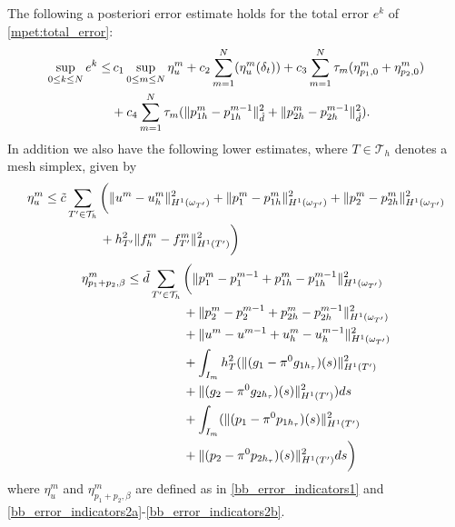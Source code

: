\begin{theorem} \label{theorem}
The following a posteriori error estimate holds for the total error $e^k$ of \eqref{mpet:total_error}: 
\begin{align} \label{mpet2_up_bd}
\sup\limits_{0\leq k \leq N} e^k \leq & \, c_1 \sup_{0\leq m\leq N } \eta^m_u + c_2\sum_{m=1}^N (\eta^m_u(\delta_t)) + c_3\sum_{m=1}^N \tau_m (\eta^m_{p_1,0} + \eta^m_{p_2,0}) \\
& + c_4\sum_{m=1}^N \tau_m (\|p^m_{1h} - p^{m-1}_{1h}\|_{\hat{d}}^2 + \|p^m_{2h} - p^{m-1}_{2h}\|_{\hat{d}}^2).\notag
\end{align}
In addition we also have the following lower estimates, where $T \in \mathcal{T}_h$ denotes a mesh simplex, given by 
\begin{align} \label{mpet2_low_bd1}
\eta^m_u \leq \tilde{c}\sum_{T' \in \mathcal{T}_h} & \,\biggl( \|u^m-u^m_h \|^2_{H^1(\omega_{T'})} + \|p_1^m-p^m_{1h} \|^2_{H^1(\omega_{T'})} + \|p_2^m-p^m_{2h} \|^2_{H^1(\omega_{T'})} \\
 & \, + h_{T'}^2 \|f^m_h-f^m_{T'}\|^2_{H^1(T')} \biggr) \notag
\end{align}
\begin{align}\label{mpet2_low_bd2}
\eta^m_{p_1+p_2,\beta} \leq \tilde{d} \sum_{T' \in \mathcal{T}_h} & \, \biggl(\|p_1^m-p_1^{m-1} + p_{1h}^m-p_{1h}^{m-1} \|^2_{H^1(\omega_{T'})} \\
& \, + \|p_2^m-p_2^{m-1} + p_{2h}^m-p_{2h}^{m-1} \|^2_{H^1(\omega_{T'})} \notag\\
& \, + \|u^m-u^{m-1} + u_h^m-u_h^{m-1} \|^2_{H^1(\omega_{T'})} \notag\\
& \, + \int_{I_m} h_{T}^2 (\|(g_1-\pi^0g_{1h_\tau})(s)\|^2_{H^1(T')} \notag\\
& \, + \|(g_2-\pi^0g_{2h_\tau})(s)\|^2_{H^1(T')}) ds  \notag\\
& \, + \int_{I_m} (\|(p_1-\pi^0p_{1h_\tau})(s)\|^2_{H^1(T')} \notag\\
& \, + \|(p_2-\pi^0p_{2h_\tau})(s)\|^2_{H^1(T')} ds \biggr)\notag
\end{align}
where $\eta^m_u$ and $\eta^m_{p_1+p_2,\beta}$ are defined as in \eqref{bb_error_indicators1} and \eqref{bb_error_indicators2a}-\eqref{bb_error_indicators2b}.
\end{theorem}
